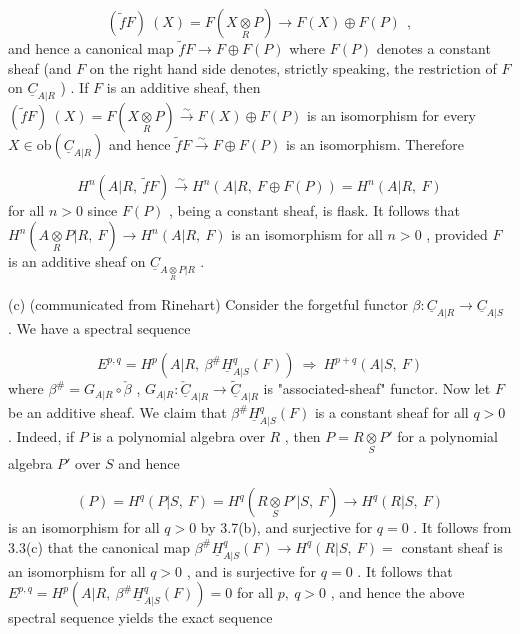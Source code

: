 \begin{equation*}
(\widetilde{f}F)\ (X) = F(X\underset{R}{\otimes}P) \to F(X)\oplus F(P)\ \ ,
\end{equation*}
and hence a canonical map  $\widetilde{f}F \to F\oplus F(P)$  where  $F(P)$  denotes a constant sheaf (and  $F$  on the right hand side denotes, strictly speaking, the restriction of  $F$ on  $\underline{C}_{A|R}$ ) . If  $F$  is an additive sheaf, then  $(\widetilde{f}F)\ (X) = F(X\underset{R}{\otimes}P) \overset{\sim}{\to} F(X)\oplus F(P)$ is an isomorphism for every  $X \in \mathrm{ob}(\underline{C}_{A|R})$  and hence  $\widetilde{f}F \overset{\sim}{\to} F\oplus F(P)$  is an isomorphism. Therefore 



\begin{equation*}
 H^{n}(A|R,\ \widetilde{f}F) \overset{\sim}{\to} H^{n}(A|R,\ F\oplus F(P)) = H^{n}(A|R,\ F)
\end{equation*}
for all  $n > 0$  since  $F(P)$ , being a constant sheaf, is flask. It follows that $H^{n}(A\underset{R}{\otimes}P|R,\ F) \to H^{n}(A|R,\ F)$  is an isomorphism for all  $n > 0$ , provided  $F$  is an additive sheaf on  $\underline{C}_{A\underset{R}{\otimes}P|R}$ .

(c)  (communicated from Rinehart) Consider the forgetful functor $\beta : \underline{C}_{A|R} \to \underline{C}_{A|S}$ . We have a spectral sequence

\begin{equation*}
E^{p,q} = H^{p}(A|R,\ \beta^{\#}\underline{H}^{q}_{A|S}(F))\ \Longrightarrow\ H^{p+q}(A|S,\ F)
\end{equation*}
where  $\beta^{\#} = G_{A|R}\circ\check{\beta}$ ,  $G_{A|R} : \underline{\check{C}}_{A|R} \to \underline{\widetilde{C}}_{A|R}$  is "associated-sheaf"  functor. Now let  $F$  be an additive sheaf. We claim that  $\beta^{\#}\underline{H}^{q}_{A|S}(F)$  is a constant sheaf for all  $q > 0$ . Indeed, if  $P$  is a polynomial algebra over  $R$ , then  $P = R\underset{S}{\otimes}P'$ for a polynomial algebra  $P'$  over  $S$  and hence

\begin{equation*}
[\beta^{\#}\underline{H}^{q}_{A|S}(F)](P) = H^{q}(P|S,\ F) = H^{q}(R\underset{S}{\otimes}P'|S,\ F) \to H^{q}(R|S,\ F)
\end{equation*}
is an isomorphism for all  $q > 0$  by 3.7(b), and surjective for  $q = 0$ . It follows from 3.3(c) that the canonical map  $\beta^{\#}\underline{H}^{q}_{A|S}(F) \to H^{q}(R|S,\ F) =$ constant sheaf is an isomorphism for all  $q > 0$ , and is surjective for  $q = 0$ . It follows that $E^{p,q} = H^{p}(A|R,\ \beta^{\#}\underline{H}^{q}_{A|S}(F)) = 0$  for all  $p,\ q > 0$ , and hence the above spectral sequence yields the exact sequence

